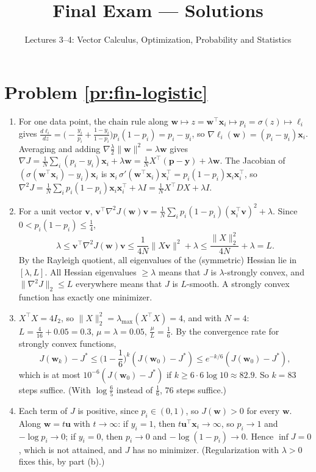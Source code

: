 \documentclass[11pt]{article}
\title{Final Exam --- Solutions}
\author{Lectures 3--4: Vector Calculus, Optimization, Probability and Statistics}
\date{}
\newcommand{\norm}[1]{\lVert #1 \rVert}
\begin{document}
\maketitle

\section*{Problem \ref{pr:fin-logistic}}

\begin{enumerate}[label=(\alph*)]
    \item For one data point, the chain rule along $\mathbf{w} \mapsto z = \mathbf{w}^\top\mathbf{x}_i \mapsto p_i = \sigma(z) \mapsto \ell_i$ gives $\frac{d\ell_i}{dz} = \big(-\frac{y_i}{p_i} + \frac{1 - y_i}{1 - p_i}\big)p_i(1 - p_i) = p_i - y_i$, so $\nabla\ell_i(\mathbf{w}) = (p_i - y_i)\mathbf{x}_i$. Averaging and adding $\nabla\frac{\lambda}{2}\norm{\mathbf{w}}^2 = \lambda\mathbf{w}$ gives $\nabla J = \frac{1}{N}\sum_i(p_i - y_i)\mathbf{x}_i + \lambda\mathbf{w} = \frac{1}{N}X^\top(\mathbf{p} - \mathbf{y}) + \lambda\mathbf{w}$. The Jacobian of $(\sigma(\mathbf{w}^\top\mathbf{x}_i) - y_i)\mathbf{x}_i$ is $\mathbf{x}_i\,\sigma'(\mathbf{w}^\top\mathbf{x}_i)\mathbf{x}_i^\top = p_i(1 - p_i)\mathbf{x}_i\mathbf{x}_i^\top$, so $\nabla^2 J = \frac{1}{N}\sum_i p_i(1 - p_i)\mathbf{x}_i\mathbf{x}_i^\top + \lambda I = \frac{1}{N}X^\top DX + \lambda I$.
    \item For a unit vector $\mathbf{v}$, $\mathbf{v}^\top\nabla^2 J(\mathbf{w})\mathbf{v} = \frac{1}{N}\sum_i p_i(1 - p_i)(\mathbf{x}_i^\top\mathbf{v})^2 + \lambda$. Since $0 < p_i(1 - p_i) \leq \frac{1}{4}$,
    \[\lambda \leq \mathbf{v}^\top\nabla^2 J(\mathbf{w})\mathbf{v} \leq \frac{1}{4N}\norm{X\mathbf{v}}^2 + \lambda \leq \frac{\norm{X}_2^2}{4N} + \lambda = L.\]
    By the Rayleigh quotient, all eigenvalues of the (symmetric) Hessian lie in $[\lambda, L]$. All Hessian eigenvalues $\geq \lambda$ means that $J$ is $\lambda$-strongly convex, and $\norm{\nabla^2 J}_2 \leq L$ everywhere means that $J$ is $L$-smooth. A strongly convex function has exactly one minimizer.
    \item $X^\top X = 4I_2$, so $\norm{X}_2^2 = \lambda_{\max}(X^\top X) = 4$, and with $N = 4$: $L = \frac{4}{16} + 0.05 = 0.3$, $\mu = \lambda = 0.05$, $\frac{\mu}{L} = \frac{1}{6}$. By the convergence rate for strongly convex functions,
    \[J(\mathbf{w}_k) - J^* \leq \Big(1 - \frac{1}{6}\Big)^k(J(\mathbf{w}_0) - J^*) \leq e^{-k/6}(J(\mathbf{w}_0) - J^*),\]
    which is at most $10^{-6}(J(\mathbf{w}_0) - J^*)$ if $k \geq 6 \cdot 6\log 10 \approx 82.9$. So $k = 83$ steps suffice. (With $\log\frac{6}{5}$ instead of $\frac{1}{6}$, $76$ steps suffice.)
    \item Each term of $J$ is positive, since $p_i \in (0, 1)$, so $J(\mathbf{w}) > 0$ for every $\mathbf{w}$. Along $\mathbf{w} = t\mathbf{u}$ with $t \to \infty$: if $y_i = 1$, then $t\mathbf{u}^\top\mathbf{x}_i \to \infty$, so $p_i \to 1$ and $-\log p_i \to 0$; if $y_i = 0$, then $p_i \to 0$ and $-\log(1 - p_i) \to 0$. Hence $\inf J = 0$, which is not attained, and $J$ has no minimizer. (Regularization with $\lambda > 0$ fixes this, by part (b).)
\end{enumerate}
\end{document}
